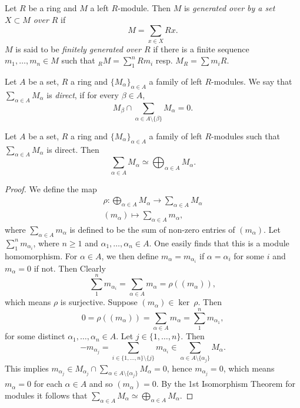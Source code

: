 \begin{definition}
    Let $R$ be a ring and $M$ a left $R$-module. Then $M$ is \emph{generated over by a set $X\subset M$ over $R$} if 
    $$
        M = \sum_{x\in X} Rx.
    $$
    $M$ is said to be \textit{finitely generated over $R$} if there is a finite sequence $m_1,\dots,m_n\in M$ such that $_RM= \sum_1^n Rm_i$ resp. $M_R = \sum m_i R$. 
\end{definition}
\begin{definition}
    Let $A$ be a set, $R$ a ring and $\{M_\alpha\}_{\alpha\in A}$ a family of left $R$-modules. We say that $\sum_{\alpha\in A} M_\alpha$ is \textit{direct}, if 
    for every $\beta \in A$,
    $$M_\beta \cap \sum_{\alpha\in A \setminus\{\beta\}} M_\alpha = 0.$$
\end{definition}
\begin{lemma}
    Let $A$ be a set, $R$ a ring and $\{M_\alpha\}_{\alpha\in A}$ a family of left $R$-modules such that $\sum_{\alpha\in A} M_\alpha$ is direct. Then 
    $$\sum_{\alpha\in A} M_\alpha \simeq \bigoplus_{\alpha \in A} M_\alpha.$$
\end{lemma}
\begin{proof}
    We define the map 
    \begin{gather*}
        \rho : \bigoplus_{\alpha \in A} M_\alpha \rightarrow \sum_{\alpha\in A} M_\alpha\\
        (m_\alpha) \mapsto \sum_{\alpha \in A} m_\alpha,
    \end{gather*}
    where $\sum_{\alpha\in A} m_\alpha$ is defined to be the sum of non-zero entries of $(m_\alpha)$. Let $\sum_1^n m_{\alpha_i}$, where $n\geq 1$ and $\alpha_1,\dots,\alpha_n\in A$. One easily finds that this is a module homomorphism. For $\alpha \in A$, we then define $m_\alpha = m_{\alpha_i}$ if $\alpha = \alpha_i$ for some $i$ and $m_\alpha = 0$ if not. Then Clearly 
    $$\sum_1^n m_{\alpha_i}=\sum_{\alpha\in A} m_\alpha =\rho((m_\alpha)),$$
    which means $\rho$ is surjective. Suppose $(m_\alpha)\in \ker \ \rho$. Then 
    $$0=\rho((m_\alpha))= \sum_{\alpha \in A} m_\alpha = \sum_1^n m_{\alpha_1},$$
    for some distinct $\alpha_1,\dots,\alpha_n\in A$. Let $j\in \{1,\dots, n\}$. Then
    $$-m_{\alpha_j} = \sum_{i\in\{1,\dots,n\}\setminus \{j\}} m_{\alpha_i} \in \sum_{\alpha \in A\setminus\{\alpha_j\}} M_\alpha. $$
    This implies $m_{\alpha_j}\in M_{\alpha_j}\cap \sum_{\alpha \in A\setminus\{\alpha_j\}} M_\alpha =0$, hence $m_{\alpha_j} = 0$, which means $m_\alpha = 0$ for each $\alpha\in A$ and so $(m_\alpha)=0$. By the 1st Isomorphism Theorem for modules it follows that $\sum_{\alpha\in A} M_\alpha \simeq \bigoplus_{\alpha \in A} M_\alpha$.  
\end{proof}
